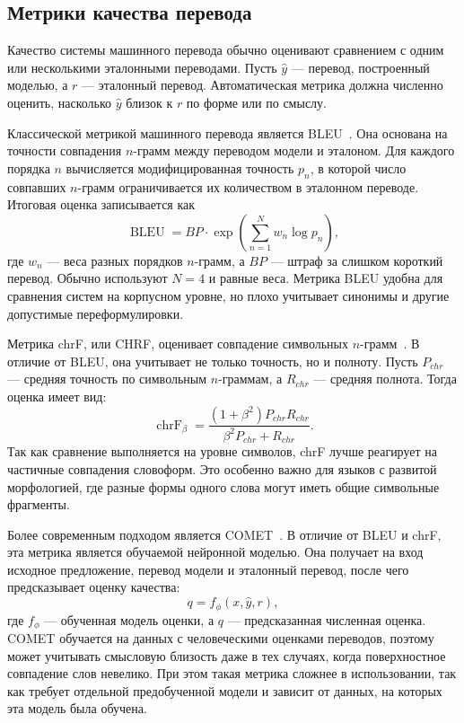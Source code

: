 \subsection{Метрики качества перевода}

Качество системы машинного перевода обычно оценивают сравнением с одним или несколькими эталонными переводами.
Пусть $\hat{y}$ --- перевод, построенный моделью, а $r$ --- эталонный перевод.
Автоматическая метрика должна численно оценить, насколько $\hat{y}$ близок к $r$ по форме или по смыслу.

Классической метрикой машинного перевода является BLEU~\cite{bleu}.
Она основана на точности совпадения $n$-грамм между переводом модели и эталоном.
Для каждого порядка $n$ вычисляется модифицированная точность $p_n$, в которой число совпавших $n$-грамм ограничивается их количеством в эталонном переводе.
Итоговая оценка записывается как
\[
	\operatorname{BLEU} = BP \cdot \exp\left(\sum_{n=1}^{N} w_n \log p_n\right),
\]
где $w_n$ --- веса разных порядков $n$-грамм, а $BP$ --- штраф за слишком короткий перевод.
Обычно используют $N = 4$ и равные веса.
Метрика BLEU удобна для сравнения систем на корпусном уровне, но плохо учитывает синонимы и другие допустимые переформулировки.

Метрика chrF, или CHRF, оценивает совпадение символьных $n$-грамм~\cite{chrf}.
В отличие от BLEU, она учитывает не только точность, но и полноту.
Пусть $P_{chr}$ --- средняя точность по символьным $n$-граммам, а $R_{chr}$ --- средняя полнота.
Тогда оценка имеет вид:
\[
	\operatorname{chrF}_{\beta} =
	\frac{(1 + \beta^2) P_{chr} R_{chr}}{\beta^2 P_{chr} + R_{chr}}.
\]
Так как сравнение выполняется на уровне символов, chrF лучше реагирует на частичные совпадения словоформ.
Это особенно важно для языков с развитой морфологией, где разные формы одного слова могут иметь общие символьные фрагменты.

Более современным подходом является COMET~\cite{comet}.
В отличие от BLEU и chrF, эта метрика является обучаемой нейронной моделью.
Она получает на вход исходное предложение, перевод модели и эталонный перевод, после чего предсказывает оценку качества:
\[
	q = f_{\phi}(x, \hat{y}, r),
\]
где $f_{\phi}$ --- обученная модель оценки, а $q$ --- предсказанная численная оценка.
COMET обучается на данных с человеческими оценками переводов, поэтому может учитывать смысловую близость даже в тех случаях, когда поверхностное совпадение слов невелико.
При этом такая метрика сложнее в использовании, так как требует отдельной предобученной модели и зависит от данных, на которых эта модель была обучена.

